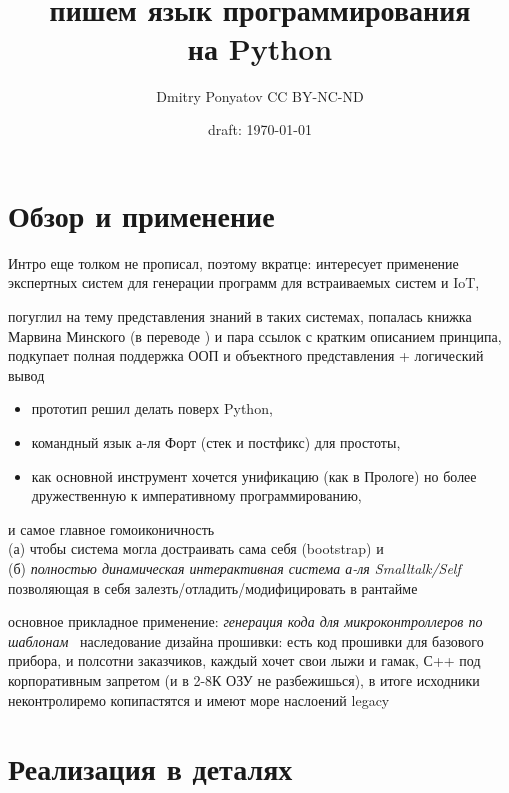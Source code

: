 

\author{Dmitry Ponyatov  CC BY-NC-ND}
\title{{\Huge \ \\\hico}\\пишем язык программирования\\на Python}
\date{draft: \today}



\maketitle
\tableofcontents



\part{Обзор и применение \hico}

Интро еще толком не прописал, поэтому вкратце:
интересует применение экспертных систем для генерации программ для встраиваемых
систем и IoT,

погуглил на тему представления знаний в таких системах, попалась
книжка Марвина Минского (в переводе \cite{minsky}) и пара ссылок с кратким
описанием принципа, подкупает полная поддержка ООП и объектного представления + логический вывод

\begin{itemize}[nosep]
  \item 
прототип решил делать поверх Python,\\
  \item 
командный язык а-ля Форт (стек и постфикс) для простоты,\\
  \item 
как основной инструмент хочется унификацию (как в Прологе) но более
дружественную к императивному программированию,\\
\end{itemize}
и самое главное гомоиконичность\\
(а) чтобы система могла достраивать сама себя (bootstrap) и\\ 
(б) \emph{полностью динамическая интерактивная система а-ля Smalltalk/Self}\\
позволяющая в себя залезть/отладить/модифицировать в рантайме

\bigskip
\noindent
основное прикладное применение: \emph{генерация кода для микроконтроллеров по
шаблонам}\ 
наследование дизайна прошивки: есть код прошивки для базового прибора, и
полсотни заказчиков, каждый хочет свои лыжи и гамак, С++ под корпоративным
запретом (и в 2-8К ОЗУ не разбежишься), в итоге исходники неконтролиремо
копипастятся и имеют море наслоений legacy


\part{Реализация в деталях}\secdown






\secup





